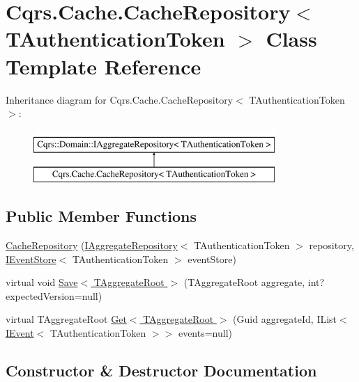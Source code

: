 \hypertarget{classCqrs_1_1Cache_1_1CacheRepository}{}\section{Cqrs.\+Cache.\+Cache\+Repository$<$ T\+Authentication\+Token $>$ Class Template Reference}
\label{classCqrs_1_1Cache_1_1CacheRepository}
Inheritance diagram for Cqrs.\+Cache.\+Cache\+Repository$<$ T\+Authentication\+Token $>$\+:\begin{figure}[H]
\begin{center}
\leavevmode
\includegraphics[height=2.000000cm]{classCqrs_1_1Cache_1_1CacheRepository}
\end{center}
\end{figure}
\subsection*{Public Member Functions}
\begin{DoxyCompactItemize}
\item 
\hyperlink{classCqrs_1_1Cache_1_1CacheRepository_a6c567e999a85f5803a920ce4912833a9_a6c567e999a85f5803a920ce4912833a9}{Cache\+Repository} (\hyperlink{interfaceCqrs_1_1Domain_1_1IAggregateRepository}{I\+Aggregate\+Repository}$<$ T\+Authentication\+Token $>$ repository, \hyperlink{interfaceCqrs_1_1Events_1_1IEventStore}{I\+Event\+Store}$<$ T\+Authentication\+Token $>$ event\+Store)
\item 
virtual void \hyperlink{classCqrs_1_1Cache_1_1CacheRepository_a69df7ee1dc2e4cd38431ab987655eab3_a69df7ee1dc2e4cd38431ab987655eab3}{Save$<$ T\+Aggregate\+Root $>$} (T\+Aggregate\+Root aggregate, int? expected\+Version=null)
\item 
virtual T\+Aggregate\+Root \hyperlink{classCqrs_1_1Cache_1_1CacheRepository_a037acba636aedf23ff376ac0b749ec0c_a037acba636aedf23ff376ac0b749ec0c}{Get$<$ T\+Aggregate\+Root $>$} (Guid aggregate\+Id, I\+List$<$ \hyperlink{interfaceCqrs_1_1Events_1_1IEvent}{I\+Event}$<$ T\+Authentication\+Token $>$$>$ events=null)
\end{DoxyCompactItemize}


\subsection{Constructor \& Destructor Documentation}
\mbox{\label{classCqrs_1_1Cache_1_1CacheRepository_a6c567e999a85f5803a920ce4912833a9_a6c567e999a85f5803a920ce4912833a9}} 
